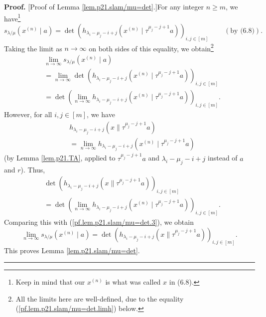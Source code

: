 \documentclass[numbers=enddot,12pt,final,onecolumn,notitlepage]{scrartcl}%
\theoremstyle{definition}
\newenvironment{proof}[1][Proof]{\noindent\textbf{#1.} }{\ \rule{0.5em}{0.5em}}
\begin{document}
\begin{enumerate}
\begin{proof}
[Proof of Lemma \ref{lem.p21.slam/mu=det}.]For any integer $n\geq m$, we
have\footnote{Keep in mind that our $x^{\left(  n\right)  }$ is what was
called $x$ in (6.8).}%
\[
s_{\lambda/\mu}\left(  x^{\left(  n\right)  }\mid a\right)  =\det\left(
h_{\lambda_{i}-\mu_{j}-i+j}\left(  x^{\left(  n\right)  }\mid\tau^{\mu
_{j}-j+1}a\right)  \right)  _{i,j\in\left[  m\right]  }%
\ \ \ \ \ \ \ \ \ \ \left(  \text{by (6.8)}\right)  .
\]
Taking the limit as $n\rightarrow\infty$ on both sides of this equality, we
obtain\footnote{All the limits here are well-defined, due to the equality
(\ref{pf.lem.p21.slam/mu=det.limh}) below.}%
\begin{align}
&  \lim\limits_{n\rightarrow\infty}s_{\lambda/\mu}\left(  x^{\left(  n\right)
}\mid a\right) \nonumber\\
&  =\lim\limits_{n\rightarrow\infty}\det\left(  h_{\lambda_{i}-\mu_{j}%
-i+j}\left(  x^{\left(  n\right)  }\mid\tau^{\mu_{j}-j+1}a\right)  \right)
_{i,j\in\left[  m\right]  }\nonumber\\
&  =\det\left(  \lim\limits_{n\rightarrow\infty}h_{\lambda_{i}-\mu_{j}%
-i+j}\left(  x^{\left(  n\right)  }\mid\tau^{\mu_{j}-j+1}a\right)  \right)
_{i,j\in\left[  m\right]  }. \label{pf.lem.p21.slam/mu=det.3}%
\end{align}
However, for all $i,j\in\left[  m\right]  $, we have%
\begin{align}
&  h_{\lambda_{i}-\mu_{j}-i+j}\left(  x\parallel\tau^{\mu_{j}-j+1}a\right)
\nonumber\\
&  =\lim\limits_{n\rightarrow\infty}h_{\lambda_{i}-\mu_{j}-i+j}\left(
x^{\left(  n\right)  }\mid\tau^{\mu_{j}-j+1}a\right)
\label{pf.lem.p21.slam/mu=det.limh}%
\end{align}
(by Lemma \ref{lem.p21.TA}, applied to $\tau^{\mu_{j}-j+1}a$ and $\lambda
_{i}-\mu_{j}-i+j$ instead of $a$ and $r$). Thus,
\begin{align*}
&  \det\left(  h_{\lambda_{i}-\mu_{j}-i+j}\left(  x\parallel\tau^{\mu_{j}%
-j+1}a\right)  \right)  _{i,j\in\left[  m\right]  }\\
&  =\det\left(  \lim\limits_{n\rightarrow\infty}h_{\lambda_{i}-\mu_{j}%
-i+j}\left(  x^{\left(  n\right)  }\mid\tau^{\mu_{j}-j+1}a\right)  \right)
_{i,j\in\left[  m\right]  }.
\end{align*}
Comparing this with (\ref{pf.lem.p21.slam/mu=det.3}), we obtain%
\[
\lim\limits_{n\rightarrow\infty}s_{\lambda/\mu}\left(  x^{\left(  n\right)
}\mid a\right)  =\det\left(  h_{\lambda_{i}-\mu_{j}-i+j}\left(  x\parallel
\tau^{\mu_{j}-j+1}a\right)  \right)  _{i,j\in\left[  m\right]  }.
\]
This proves Lemma \ref{lem.p21.slam/mu=det}.
\end{proof}


\end{enumerate}
\end{document}
